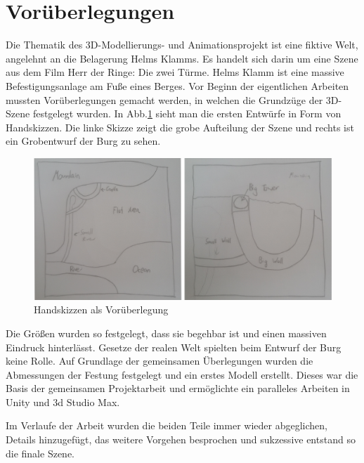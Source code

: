 \section{Vorüberlegungen}

Die Thematik des 3D-Modellierungs- und Animationsprojekt ist eine fiktive Welt, angelehnt an die Belagerung Helms Klamms. Es handelt sich darin um eine Szene aus dem Film Herr der Ringe: Die zwei Türme. Helms Klamm ist eine massive Befestigungsanlage am Fuße eines Berges. Vor Beginn der eigentlichen Arbeiten mussten Vorüberlegungen gemacht werden, in welchen die Grundzüge der 3D-Szene festgelegt wurden. In Abb.\ref{handskizze} sieht man die ersten Entwürfe in Form von Handskizzen. Die linke Skizze zeigt die grobe Aufteilung der Szene und rechts ist ein Grobentwurf der Burg zu sehen.

\begin{figure}[h]
	
	\centering
	\includegraphics[width=0.95\linewidth]{Abbildungen/Unity/Skizzen}
	\caption{Handskizzen als Vorüberlegung}
	\label{handskizze}
\end{figure}


Die Größen wurden so festgelegt, dass sie begehbar ist und einen massiven Eindruck hinterlässt. Gesetze der realen Welt spielten beim Entwurf der Burg keine Rolle. Auf Grundlage der gemeinsamen Überlegungen wurden die Abmessungen der Festung festgelegt und ein erstes Modell erstellt. Dieses war die Basis der gemeinsamen Projektarbeit und ermöglichte ein paralleles Arbeiten in Unity und 3d Studio Max.

Im Verlaufe der Arbeit wurden die beiden Teile immer wieder abgeglichen, Details hinzugefügt, das weitere Vorgehen besprochen und sukzessive entstand so die finale Szene. 